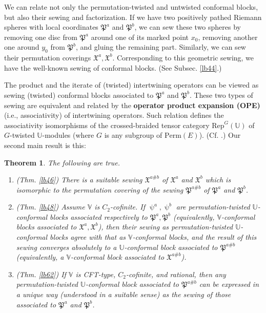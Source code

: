 \documentclass[11pt,b5paper,notitlepage]{article}
\theoremstyle{definition}
\theoremstyle{plain}
\newtheorem{Mthm}{Theorem}
\newcommand{\fk}{\mathfrak}
\newcommand{\Rep}{\mathrm{Rep}}
\newcommand{\Vbb}{\mathbb V}
\newcommand{\Ubb}{\mathbb U}
\newcommand{\Perm}{\mathrm{Perm}}
\numberwithin{equation}{subsection}
\begin{document}
We can relate not only  the permutation-twisted and untwisted conformal blocks, but also their sewing and factorization. If we have two positively pathed Riemann spheres with local coordinates $\fk P^a$ and $\fk P^b$, we can sew these two spheres by removing one disc from $\fk P^a$ around one of its marked point $x_0$, removing another one around $y_0$ from $\fk P^b$, and gluing the remaining part. Similarly, we can sew their permutation coverings $\fk X^a,\fk X^b$. Corresponding to this geometric sewing, we have the well-known sewing of conformal blocks. (See Subsec. \ref{lb44}.)

The product and the iterate of (twisted) intertwining operators can be viewed as sewing (twisted) conformal blocks associated to $\fk P^a$ and $\fk P^b$. These two types of sewing are equivalent and related by the \textbf{operator product expansion (OPE)} (i.e., associativity) of intertwining operators. Such relation defines the associativity isomorphisms of the crossed-braided tensor category $\Rep^G(\Ubb)$ of $G$-twisted $\Ubb$-modules (where $G$ is any subgroup of $\Perm(E)$). (Cf. \cite{Hua95,McR21}.) Our second main result is this: 


\begin{Mthm}\label{lb70}
The following are true.
\begin{enumerate}
\item (Thm. \ref{lb46}) There is a suitable sewing $\fk X^{a\#b}$  of $\fk X^a$ and $\fk X^b$ which is isomorphic to the permutation covering of the sewing $\fk P^{a\#b}$ of $\fk P^a$ and $\fk P^b$. 
\item (Thm. \ref{lb48}) Assume $\Vbb$ is $C_2$-cofinite. If $\uppsi^a,\uppsi^b$ are permutation-twisted $\Ubb$-conformal blocks associated respectively to $\fk P^a,\fk P^b$ (equivalently, $\Vbb$-conformal blocks associated to $\fk X^a,\fk X^b$), then their sewing as permutation-twisted $\Ubb$-conformal blocks agree with that as $\Vbb$-conformal blocks, and the result of this sewing converges absolutely to a  $\Ubb$-conformal block associated to $\fk P^{a\#b}$ (equivalently, a $\Vbb$-conformal block associated to $\fk X^{a\#b}$).

\item (Thm. \ref{lb62}) If $\Vbb$ is CFT-type, $C_2$-cofinite, and rational, then any permutation-twisted $\Ubb$-conformal block associated to $\fk P^{a\#b}$ can be expressed in a unique way (understood in a suitable sense) as the sewing of those associated to $\fk P^a$ and $\fk P^b$.
\end{enumerate}
\end{Mthm}
\end{document}
